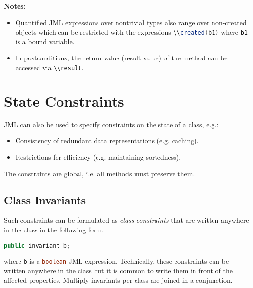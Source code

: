 \documentclass[a4paper, 11pt, accentcolor = tud3b]{tudreport}
\newcommand{\inlineJava}[1]{\lstinline[language = Java]|#1|}
\begin{document}
			\textbf{Notes:}
			\begin{itemize}
				\item Quantified JML expressions over nontrivial types also range over non-created objects which can be restricted with the expressions \inlineJava{\\created(b1)} where \texttt{b1} is a bound variable.
				\item In postconditions, the return value (result value) of the method can be accessed via \inlineJava{\\result}.
			\end{itemize}

		\section{State Constraints}
			JML can also be used to specify constraints on the state of a class, e.g.:
			\begin{itemize}
				\item Consistency of redundant data representations (e.g. caching).
				\item Restrictions for efficiency (e.g. maintaining sortedness).
			\end{itemize}
			The constraints are global, i.e. all methods must preserve them.

			\subsection{Class Invariants}
				\label{sec:classinv}
			
				Such constraints can be formulated as \textit{class constraints} that are written anywhere in the class in the following form:
				\begin{center}
					\inlineJava{public invariant b;}
				\end{center}
				where \texttt{b} is a \inlineJava{boolean} JML expression. Technically, these constraints can be written anywhere in the class but it is common to write them in front of the affected properties. Multiply invariants per class are joined in a conjunction.
				
\end{document}
